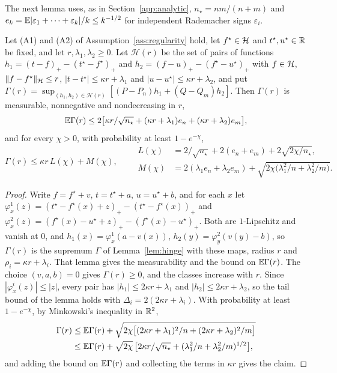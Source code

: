 The next lemma uses, as in Section~\ref{app:analytic}, $n_\star=nm/(n+m)$ and $e_k=\mathbb{E}|\varepsilon_1+\dots+
\varepsilon_k|/k\le k^{-1/2}$ for independent Rademacher signs $\varepsilon_i$.

\begin{lemma}
\label{lem:localmod}
Let (A1) and (A2) of Assumption~\ref{ass:regularity} hold, let $f^\star\in\mathcal{H}$ and $t^\star,u^\star\in\mathbb{R}$ be fixed, and
let $r,\lambda_1,\lambda_2\ge0$. Let $\mathcal H(r)$ be the set of pairs of functions $h_1=(t-f)_+-(t^\star-f^\star)_+$
and $h_2=(f-u)_+-(f^\star-u^\star)_+$ with $f\in\mathcal{H}$, $\|f-f^\star\|_{\mathcal{H}}\le r$, $|t-t^\star|\le\kappa r+\lambda_1$ and
$|u-u^\star|\le\kappa r+\lambda_2$, and put $\Gamma(r)=\sup_{(h_1,h_2)\in\mathcal H(r)}[(P-P_n)h_1+(Q-Q_m)h_2]$. Then $\Gamma(r)$
is measurable, nonnegative and nondecreasing in $r$,
\[
\mathbb{E} \Gamma(r)\le2\big[\kappa r/\sqrt{n_\star}+(\kappa r+\lambda_1)e_n+(\kappa r+\lambda_2)e_m\big],
\]
and for every $\chi>0$, with probability at least $1-e^{-\chi}$,
\[
\Gamma(r)\le\kappa r\,L(\chi)+M(\chi),
\qquad
\begin{aligned}
L(\chi)&=2/\sqrt{n_\star}+2(e_n+e_m)+2\sqrt{2\chi/n_\star},\\
M(\chi)&=2(\lambda_1e_n+\lambda_2e_m)+\sqrt{2\chi\big(\lambda_1^2/n+\lambda_2^2/m\big)} .
\end{aligned}
\]
\end{lemma}

\begin{proof}
Write $f=f^\star+v$, $t=t^\star+a$, $u=u^\star+b$, and for each $x$ let $\varphi^1_x(z)=(t^\star-f^\star(x)+z)_+-(t^\star-
f^\star(x))_+$ and $\varphi^2_x(z)=(f^\star(x)-u^\star+z)_+-(f^\star(x)-u^\star)_+$. Both are $1$-Lipschitz and vanish
at $0$, and $h_1(x)=\varphi^1_x(a-v(x))$, $h_2(y)=\varphi^2_y(v(y)-b)$, so $\Gamma(r)$ is the supremum $\Gamma$ of
Lemma~\ref{lem:hinge} with these maps, radius $r$ and $\rho_i=\kappa r+\lambda_i$. That lemma gives the measurability and
the bound on $\mathbb{E} \Gamma(r)$. The choice $(v,a,b)=0$ gives $\Gamma(r)\ge0$, and the classes increase with $r$. Since
$|\varphi^i_x(z)|\le|z|$, every pair has $|h_1|\le2\kappa r+\lambda_1$ and $|h_2|\le2\kappa r+\lambda_2$, so the tail
bound of the lemma holds with $\Delta_i=2(2\kappa r+\lambda_i)$. With probability at least $1-e^{-\chi}$, by
Minkowski's inequality in $\mathbb{R}^2$,
\[
\begin{aligned}
\Gamma(r)&\le\mathbb{E} \Gamma(r)+\sqrt{2\chi\big[(2\kappa r+\lambda_1)^2/n+(2\kappa r+\lambda_2)^2/m\big]}\\
&\le\mathbb{E} \Gamma(r)+\sqrt{2\chi}\,\big[2\kappa r/\sqrt{n_\star}+(\lambda_1^2/n+\lambda_2^2/m)^{1/2}\big],
\end{aligned}
\]
and adding the bound on $\mathbb{E} \Gamma(r)$ and collecting the terms in $\kappa r$ gives the claim.
\end{proof}

